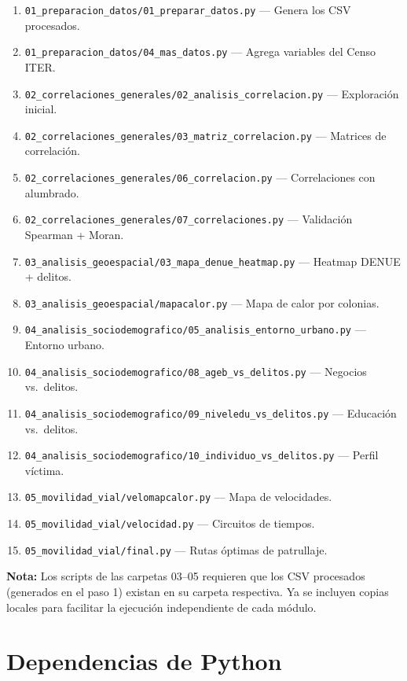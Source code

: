\documentclass[12pt, a4paper]{article}
\begin{document}
\begin{enumerate}
    \item \texttt{01\_preparacion\_datos/01\_preparar\_datos.py} --- Genera los CSV procesados.
    \item \texttt{01\_preparacion\_datos/04\_mas\_datos.py} --- Agrega variables del Censo ITER.
    \item \texttt{02\_correlaciones\_generales/02\_analisis\_correlacion.py} --- Exploración inicial.
    \item \texttt{02\_correlaciones\_generales/03\_matriz\_correlacion.py} --- Matrices de correlación.
    \item \texttt{02\_correlaciones\_generales/06\_correlacion.py} --- Correlaciones con alumbrado.
    \item \texttt{02\_correlaciones\_generales/07\_correlaciones.py} --- Validación Spearman + Moran.
    \item \texttt{03\_analisis\_geoespacial/03\_mapa\_denue\_heatmap.py} --- Heatmap DENUE + delitos.
    \item \texttt{03\_analisis\_geoespacial/mapacalor.py} --- Mapa de calor por colonias.
    \item \texttt{04\_analisis\_sociodemografico/05\_analisis\_entorno\_urbano.py} --- Entorno urbano.
    \item \texttt{04\_analisis\_sociodemografico/08\_ageb\_vs\_delitos.py} --- Negocios vs.\ delitos.
    \item \texttt{04\_analisis\_sociodemografico/09\_niveledu\_vs\_delitos.py} --- Educación vs.\ delitos.
    \item \texttt{04\_analisis\_sociodemografico/10\_individuo\_vs\_delitos.py} --- Perfil víctima.
    \item \texttt{05\_movilidad\_vial/velomapcalor.py} --- Mapa de velocidades.
    \item \texttt{05\_movilidad\_vial/velocidad.py} --- Circuitos de tiempos.
    \item \texttt{05\_movilidad\_vial/final.py} --- Rutas óptimas de patrullaje.
\end{enumerate}

\textbf{Nota:} Los scripts de las carpetas 03--05 requieren que los CSV procesados (generados en el paso 1) existan en su carpeta respectiva. Ya se incluyen copias locales para facilitar la ejecución independiente de cada módulo.

\section{Dependencias de Python}
\end{document}
